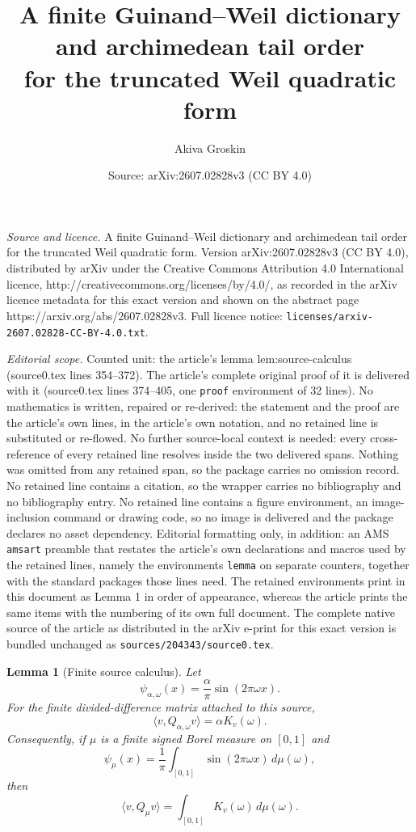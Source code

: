 \documentclass[10pt,a4paper]{amsart}
\title{A finite Guinand--Weil dictionary and archimedean tail order\\ for the truncated Weil quadratic form}
\author{Akiva Groskin}
\date{Source: arXiv:2607.02828v3 (CC BY 4.0)}
\newtheorem{lemma}{Lemma}
\newcommand{\dd}{\,d}
\begin{document}
\maketitle

\noindent\emph{Source and licence.} A finite Guinand--Weil dictionary and archimedean tail order\\ for the truncated Weil quadratic form. Version arXiv:2607.02828v3 (CC BY 4.0), distributed by arXiv under the Creative Commons Attribution 4.0 International licence, http://creativecommons.org/licenses/by/4.0/, as recorded in the arXiv licence metadata for this exact version and shown on the abstract page https://arxiv.org/abs/2607.02828v3. Full licence notice: \texttt{licenses/arxiv-2607.02828-CC-BY-4.0.txt}.\par\smallskip

\noindent\textit{Editorial scope.} Counted unit: the article's lemma lem:source-calculus (source0.tex lines 354--372). The article's complete original proof of it is delivered with it (source0.tex lines 374--405, one \texttt{proof} environment of 32 lines). No mathematics is written, repaired or re-derived: the statement and the proof are the article's own lines, in the article's own notation, and no retained line is substituted or re-flowed.  No further source-local context is needed: every cross-reference of every retained line resolves inside the two delivered spans.  Nothing was omitted from any retained span, so the package carries no omission record.  No retained line contains a citation, so the wrapper carries no bibliography and no bibliography entry.  No retained line contains a figure environment, an image-inclusion command or drawing code, so no image is delivered and the package declares no asset dependency.  Editorial formatting only, in addition: an AMS \texttt{amsart} preamble that restates the article's own declarations and macros used by the retained lines, namely the environments \texttt{lemma} on separate counters, together with the standard packages those lines need.  The retained environments print in this document as Lemma 1 in order of appearance, whereas the article prints the same items with the numbering of its own full document.  The complete native source of the article as distributed in the arXiv e-print for this exact version is bundled unchanged as \texttt{sources/204343/source0.tex}.
\begin{lemma}[Finite source calculus]\label{lem:source-calculus}
Let
\[
        \psi_{\alpha,\omega}(x)=\frac{\alpha}{\pi}\sin(2\pi\omega x).
\]
For the finite divided-difference matrix attached to this source,
\[
        \langle v,Q_{\alpha,\omega}v\rangle=\alpha K_v(\omega).
\]
Consequently, if $\mu$ is a finite signed Borel measure on $[0,1]$ and
\[
        \psi_\mu(x)=\frac1\pi\int_{[0,1]}\sin(2\pi\omega x)\dd\mu(\omega),
\]
then
\[
        \langle v,Q_\mu v\rangle
        =\int_{[0,1]}K_v(\omega)\dd\mu(\omega).
\]
\end{lemma}
\end{document}
